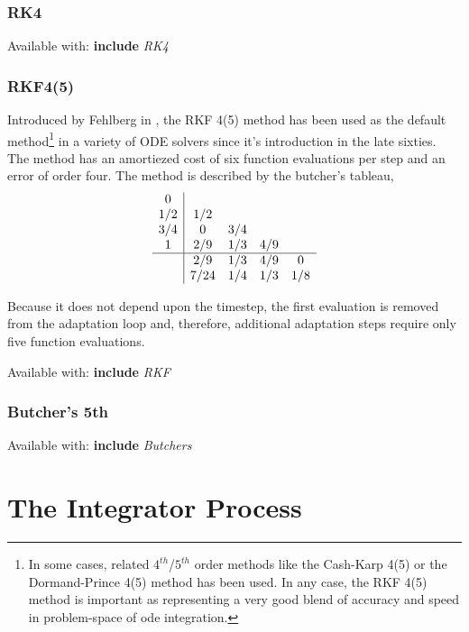 \documentclass[letterpaper,10pt]{book}
\newcommand{\srcas}[1]{Available with: \textbf{include} \textlangle{}\textit{#1}\textrangle{}}
\begin{document}
    
      \subsection{RK4}
    	\srcas{RK4}

    
      \subsection{RKF4(5)}
	Introduced by Fehlberg in \cite{fehlberg1969low}, the RKF 4(5) method has been used as the default method\footnote{In some cases, related $4^{th}$/$5^{th}$ order methods like the Cash-Karp 4(5) or the Dormand-Prince 4(5) method has been used.  In any case, the RKF 4(5) method is important as representing a very good blend of accuracy and speed in problem-space of ode integration.} in a variety of ODE solvers since it's introduction in the late sixties.  The method has an amortiezed cost of six function evaluations per step and an error of order four.  The method is described by the butcher's tableau,
	\[
	  \begin{array}{c|cccc}
	    0 & & & &\\
	    1/2 & 1/2 & & &\\
	    3/4 & 0 & 3/4 & &\\	    
	    1 & 2/9 & 1/3 & 4/9 &\\	    
	    \hline
	    & 2/9 & 1/3 & 4/9 & 0\\
	    & 7/24 & 1/4 & 1/3 & 1/8\\
	  \end{array}
	\]
	
	Because it does not depend upon the timestep, the first evaluation is removed from the adaptation loop and, therefore, additional adaptation steps require only five function evaluations.
	
	\srcas{RKF}
    

      \subsection{Butcher's 5th}
	\srcas{Butchers}
    
    

  \chapter{The Integrator Process}
    
\end{document}
